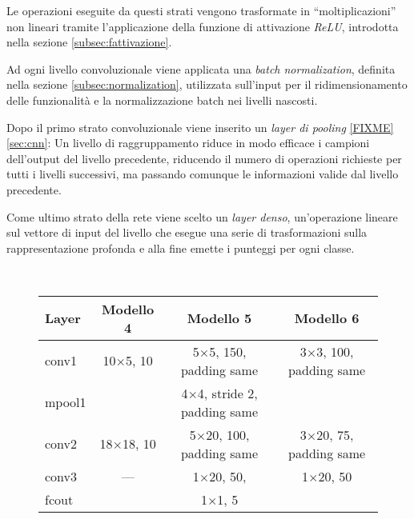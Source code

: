 Le operazioni eseguite da questi strati vengono trasformate in ``moltiplicazioni'' non lineari tramite l'applicazione della funzione di attivazione \emph{ReLU}, introdotta nella sezione \ref{subsec:fattivazione}.

Ad ogni livello convoluzionale viene applicata una \emph{batch normalization}, definita nella sezione \ref{subsec:normalization}, {\color{blue} utilizzata sull'input per il ridimensionamento delle funzionalità e la normalizzazione batch nei livelli nascosti.}

{\color{red} Dopo il primo strato convoluzionale viene inserito un \emph{layer di pooling} \cite{FIXME} \ref{FIXME} \ref{sec:cnn}: Un livello di raggruppamento riduce in modo efficace i campioni dell'output del livello precedente, riducendo il numero di operazioni richieste per tutti i livelli successivi, ma passando comunque le informazioni valide dal livello precedente.

Come ultimo strato della rete viene scelto un \emph{layer denso}, un'operazione lineare sul vettore di input del livello che esegue una serie di trasformazioni sulla rappresentazione profonda e alla fine emette i punteggi per ogni classe.}\\


\begin{figure}[H]
	\centering
	\begin{tabular}{lccc}
		\toprule
		\textbf{Layer}& \textbf{Modello 4} & \textbf{Modello 5} & \textbf{Modello 6} 		\\ 
		\midrule
		conv1 	& \num{10}$\times$\num{5}, 10	  & \num{5}$\times$\num{5}, 150, padding same    &\num{3}$\times$\num{3}, 100, padding same 		   \\
		
		mpool1 	& &{\num{4}$\times$\num{4}, stride 2, padding same}	&   \\
		conv2  	& \num{18}$\times$\num{18}, 10	  &  \num{5}$\times$\num{20}, 100, padding same	  &		\num{3}$\times$\num{20}, 75, padding same    \\
		conv3  	& ---	  & \num{1}$\times$\num{20}, 50, 	   &	\num{1}$\times$\num{20}, 50 	   \\
		fcout		& &{\num{1}$\times$\num{1}, 5}&		   \\
		
		\bottomrule	
	\end{tabular}
	\label{tab:netemb1}
\end{figure}

